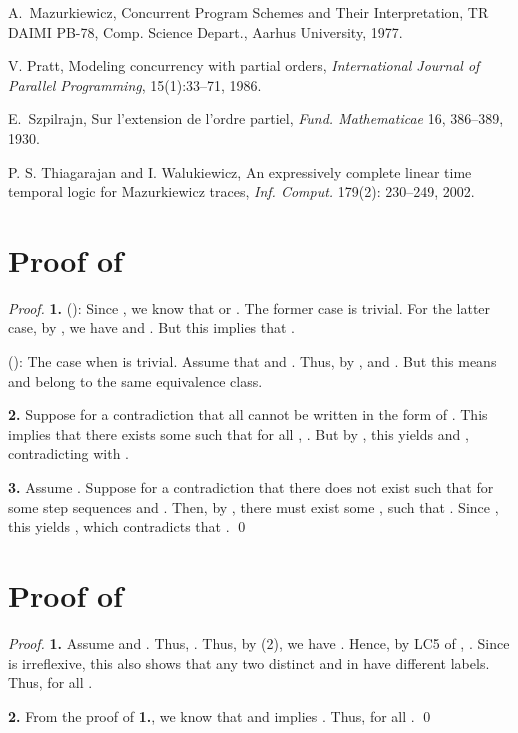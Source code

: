 \documentclass{llncs}
\begin{document}
\begin{thebibliography}{19}
A.~Mazurkiewicz,
\newblock Concurrent Program Schemes and Their Interpretation, TR DAIMI PB-78, Comp. Science Depart., Aarhus University, 1977.





V. Pratt,
\newblock Modeling concurrency with partial orders,
{\em International Journal of Parallel Programming}, 15(1):33--71, 1986.



E.~Szpilrajn, Sur l'extension de l'ordre partiel, {\em Fund. Mathematicae} 16, 386--389, 1930.


 P. S. Thiagarajan and I. Walukiewicz, An expressively complete linear time temporal logic for Mazurkiewicz traces, \emph{Inf. Comput.} 179(2): 230--249, 2002.





\end{thebibliography}

\appendix
\section{Proof of }
\begin{proof}\textbf{1.} ():  Since ,  we know that  or . The former case is trivial. For the latter case, by ,  we have
 and . 
But this implies that .

(): The case when  is trivial. Assume that   and . Thus, by ,  and . But this means  and  belong to the same equivalence class.

\textbf{2. } Suppose for a contradiction that all  cannot be written in the form of . This implies that there exists some  such that for all , . But by , this yields  and , contradicting with .

\textbf{3. } Assume . Suppose for a contradiction that there does not exist  such that  for some step sequences  and . Then, by  ,  there must exist some , such that . Since , this yields , which  contradicts that .
\qed
\end{proof}



\section{Proof of }
\begin{proof}\textbf{1. } Assume  and . Thus, .  Thus, by  (2), we have . Hence, by \textsf{LC5} of ,  . Since  is irreflexive, this also shows that any two distinct  and  in  have different labels. Thus,  for all .

\textbf{2. } From the proof of \textbf{1.}, we know that   and  implies . Thus,  for all .
\qed
\end{proof}
\end{document}
